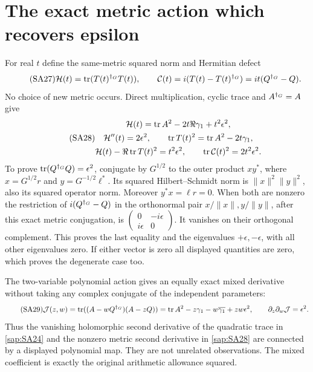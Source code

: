 \documentclass[11pt]{article}
\begin{document}
\section{The exact metric action which recovers epsilon}

For real $t$ define the same-metric squared norm and
Hermitian defect
\begin{equation}\tag{SA27}\label{sap:SA27}
\mathcal H(t)=\operatorname{tr}(T(t)^{\dagger_G}T(t)),\qquad
\mathcal C(t)=i(T(t)-T(t)^{\dagger_G})
=it(Q^{\dagger_G}-Q).
\end{equation}
No choice of new metric occurs. Direct multiplication,
cyclic trace and $A^{\dagger_G}=A$ give
\begin{equation}\tag{SA28}\label{sap:SA28}
\begin{gathered}
\mathcal H(t)=\operatorname{tr} A^2-2t\Re\gamma_1+t^2\epsilon^2,\\
\mathcal H''(t)=2\epsilon^2,\qquad
\operatorname{tr} T(t)^2=\operatorname{tr} A^2-2t\gamma_1,\\
\mathcal H(t)-\Re\operatorname{tr} T(t)^2=t^2\epsilon^2,\qquad
\operatorname{tr}\mathcal C(t)^2=2t^2\epsilon^2.
\end{gathered}
\end{equation}
To prove $\operatorname{tr}(Q^{\dagger_G}Q)=\epsilon^2$, conjugate by
$G^{1/2}$ to the outer product
$xy^*$, where $x=G^{1/2}r$ and
$y=G^{-1/2}\ell^*$. Its squared Hilbert--Schmidt norm is
$\|x\|^2\|y\|^2$, also its squared operator norm.
Moreover $y^*x=\ell r=0$.
When both are nonzero the restriction of
$i(Q^{\dagger_G}-Q)$ in the orthonormal pair
$x/\|x\|,y/\|y\|$, after this exact metric conjugation,
is
$\left(\begin{smallmatrix}0&-i\epsilon\\
i\epsilon&0\end{smallmatrix}\right)$.
It vanishes on their orthogonal complement. This proves
the last equality and the eigenvalues
$+\epsilon,-\epsilon$, with all other eigenvalues zero.
If either vector is zero all displayed quantities are
zero, which proves the degenerate case too.

The two-variable polynomial action gives an equally exact
mixed derivative without taking any complex conjugate of
the independent parameters:
\begin{equation}\tag{SA29}\label{sap:SA29}
\mathcal J(z,w)=\operatorname{tr}((A-wQ^{\dagger_G})(A-zQ))
=\operatorname{tr} A^2-z\gamma_1-w\overline{\gamma_1}+zw\epsilon^2,
\qquad \partial_z\partial_w\mathcal J=\epsilon^2 .
\end{equation}
Thus the vanishing holomorphic second derivative of the
quadratic trace in \eqref{sap:SA24} and the nonzero metric
second derivative in \eqref{sap:SA28} are connected by a
displayed polynomial map. They are not unrelated
observations. The mixed coefficient is exactly the
original arithmetic allowance squared.
\end{document}
